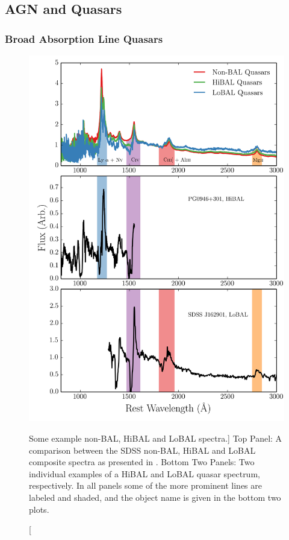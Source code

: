 \subsection{AGN and Quasars}
\label{sec:agn_winds}

\subsubsection{Broad Absorption Line Quasars}
\label{sec:balqsos}

\begin{figure}
\centering
\includegraphics[width=1.0\textwidth]{figures/02-outflows/bal_spectra.png}
\caption
[Some example non-BAL, HiBAL and LoBAL spectra.]
{
Top Panel: A comparison between the SDSS non-BAL, HiBAL and LoBAL
composite spectra as presented in \cite{reichard2003}. 
Bottom Two Panels: Two individual examples of a HiBAL and LoBAL quasar
spectrum, respectively. In all panels some of the more prominent
lines are labeled and shaded, and the object name is given in 
the bottom two plots.
} 
\label{fig:bals}
\end{figure}

